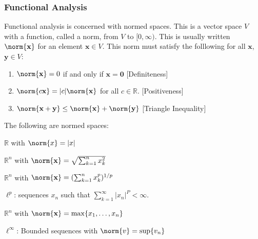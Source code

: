 \documentclass[crop=false,class=article,oneside]{standalone}
\begin{document}
        \subsubsection{Functional Analysis}
            Functional analysis is concerned with normed spaces.
            This is a vector space $V$ with a function, called
            a norm, from $V$ to $[0,\infty)$. This is usually
            written $\norm{\mathbf{x}}$ for an element
            $\mathbf{x}\in{V}$. This norm must satisfy the
            folllowing for all $\mathbf{x}$, $\mathbf{y}\in{V}$:
            \begin{enumerate}
                \item $\norm{\mathbf{x}}=0$ if and only
                      if $\mathbf{x}=\mathbf{0}$
                      \hfill[Definiteness]
                \item $\norm{c\mathbf{x}}=|c|\norm{\mathbf{x}}$
                      for all $c\in\mathbb{R}$.
                      \hfill[Positiveness]
                \item $\norm{\mathbf{x}+\mathbf{y}}%
                       \leq\norm{\mathbf{x}}+\norm{\mathbf{y}}$
                      \hfill[Triangle Inequality]
            \end{enumerate}
            \begin{example}
                The following are normed spaces:
                \begin{enumerate}
                    \begin{multicols}{2}
                        \item $\mathbb{R}$ with $\norm{x}=|x|$
                        \item $\mathbb{R}^{n}$ with
                              $\norm{\mathbf{x}}%
                               =\sqrt{\sum_{k=1}^{n}x_{k}^{2}}$
                        \item $\mathbb{R}^{n}$ with
                              $\norm{\mathbf{x}}%
                               =(\sum_{k=1}^{n}x_{k}^{p})^{1/p}$
                        \item $\ell^{p}$: sequences $x_{n}$
                              such that
                              $\sum_{k=1}^{\infty}|x_{n}|^P%
                               <\infty$.
                        \item $\mathbb{R}^{n}$ with
                              $\norm{\mathbf{x}}%
                               =\max\{x_{1},\hdots,x_{n}\}$
                        \item $\ell^{\infty}$: Bounded sequences
                              with $\norm{v}=\sup\{v_{n}\}$
                    \end{multicols}
                \end{enumerate}
            \end{example}
\end{document}

